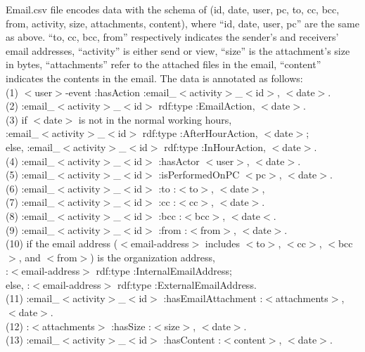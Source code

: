 Email.csv file encodes data with the schema of (id, date, user, pc, to, cc, bcc, from, activity, size, attachments, content), where ``id, date, user, pc'' are the same as above. 
``to, cc, bcc, from'' respectively indicates the sender's and receivers' email addresses, ``activity'' is either send or view, ``size'' is the attachment's size in bytes, ``attachments'' refer to the attached files in the email, ``content'' indicates the contents in the email. 
The data is annotated as follows: \\
(1) $<$user$>$-event :hasAction :email\_$<$activity$>$\_$<$id$>$, $<$date$>$. \\
(2) :email\_$<$activity$>$\_$<$id$>$ rdf:type :EmailAction, $<$date$>$. \\
(3) if $<$date$>$ is not in the normal working hours, \\
:email\_$<$activity$>$\_$<$id$>$ rdf:type :AfterHourAction, $<$date$>$; \\
else, :email\_$<$activity$>$\_$<$id$>$ rdf:type :InHourAction, $<$date$>$. \\ 
(4) :email\_$<$activity$>$\_$<$id$>$ :hasActor $<$user$>$, $<$date$>$. \\
(5) :email\_$<$activity$>$\_$<$id$>$ :isPerformedOnPC $<$pc$>$, $<$date$>$.\\ 
(6) :email\_$<$activity$>$\_$<$id$>$ :to :$<$to$>$, $<$date$>$,\\
(7) :email\_$<$activity$>$\_$<$id$>$ :cc :$<$cc$>$, $<$date$>$. \\
(8) :email\_$<$activity$>$\_$<$id$>$ :bcc :$<$bcc$>$, $<$date$<$. \\
(9) :email\_$<$activity$>$\_$<$id$>$ :from :$<$from$>$, $<$date$>$. \\
(10) if the email address ($<$email-address$>$ includes $<$to$>$, $<$cc$>$, $<$bcc$>$, and $<$from$>$) is the organization address,\\
:$<$email-address$>$ rdf:type :InternalEmailAddress;\\
else, :$<$email-address$>$ rdf:type :ExternalEmailAddress.\\ 
(11) :email\_$<$activity$>$\_$<$id$>$ :hasEmailAttachment :$<$attachments$>$, $<$date$>$. \\
(12) :$<$attachments$>$ :hasSize :$<$size$>$, $<$date$>$.\\
(13) :email\_$<$activity$>$\_$<$id$>$ :hasContent :$<$content$>$, $<$date$>$. 

